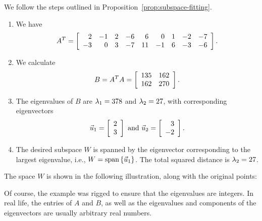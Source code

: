 \documentclass{ximera}
\begin{document}
\begin{solution}
  We follow the steps outlined in
  Proposition~\ref{prop:subspace-fitting}.
  \begin{enumerate}
  \item We have
    \begin{equation*}
      A^T = \startmat{rrrrrrrrr}
        2 & -1 & 2 & -6 & 6 & 0 & 1 & -2 & -7 \\
        -3 & 0 & 3 & -7 & 11 & -1 & 6 & -3 & -6
      \stopmat.
    \end{equation*}
  \item We calculate
    \begin{equation*}
      B = A^TA = \startmat{rr}
        135 & 162 \\
        162 & 270
      \stopmat.
    \end{equation*}
  \item The eigenvalues of $B$ are $\eigenvar_1 = 378$ and
    $\eigenvar_2 = 27$, with corresponding eigenvectors
    \begin{equation*}
      \vect{u}_1 = \startmat{r} 2 \\ 3 \stopmat
      \quad\mbox{and}\quad
      \vect{u}_2 = \startmat{r} 3 \\ -2 \stopmat.
    \end{equation*}
  \item The desired subspace $W$ is spanned by the eigenvector
    corresponding to the largest eigenvalue, i.e.,
    $W=\sspan\set{\vect{u}_1}$. The total squared distance is
    $\eigenvar_2 = 27$.
  \end{enumerate}
  The space $W$ is shown in the following illustration, along with the
  original points:
  \begin{center}
  \end{center}
  Of course, the example was rigged to ensure that the eigenvalues are
  integers. In real life, the entries of $A$ and $B$, as well as the
  eigenvalues and components of the eigenvectors are usually arbitrary
  real numbers.
\end{solution}
\end{document}
